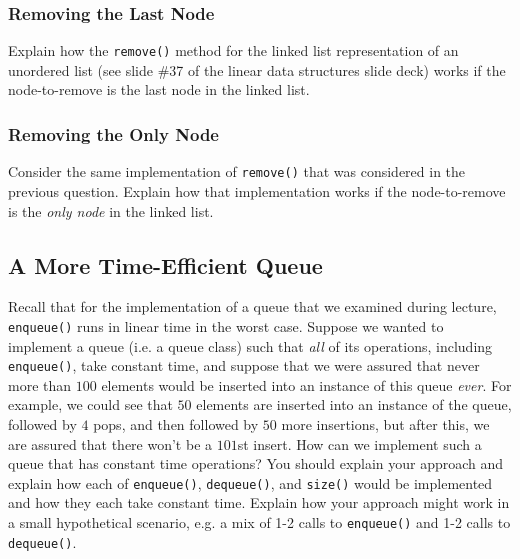 \documentclass{article}
\begin{document}
\begin{mdframed}
\vspace{3em}
\end{mdframed}

\subsubsection{Removing the Last Node}

Explain how the \lstinline{remove()} method for the linked list representation of an unordered list (see slide \#37 of the linear data structures slide deck) works if the node-to-remove is the last node in the linked list.

\begin{mdframed}
\vspace{3em}
\end{mdframed}

\subsubsection{Removing the Only Node}

Consider the same implementation of \lstinline{remove()} that was considered in the previous question. Explain how that implementation works if the node-to-remove is the \textit{only node} in the linked list.

\begin{mdframed}
\vspace{3em}
\end{mdframed}

\subsection{A More Time-Efficient Queue}

Recall that for the implementation of a queue that we examined during lecture, \lstinline{enqueue()} runs in linear time in the worst case. Suppose we wanted to implement a queue (i.e. a queue class) such that \textit{all} of its operations, including \lstinline{enqueue()}, take constant time, and suppose that we were assured that never more than $100$ elements would be inserted into an instance of this queue \textit{ever}. For example, we could see that $50$ elements are inserted into an instance of the queue, followed by $4$ pops, and then followed by $50$ more insertions, but after this, we are assured that there won't be a $101$st insert. How can we implement such a queue that has constant time operations? You should explain your approach and explain how each of \lstinline{enqueue()}, \lstinline{dequeue()}, and \lstinline{size()} would be implemented and how they each take constant time. Explain how your approach might work in a small hypothetical scenario, e.g. a mix of 1-2 calls to \lstinline{enqueue()} and 1-2 calls to \lstinline{dequeue()}.
\end{document}
